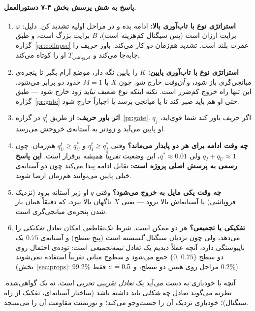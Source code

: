 \documentclass[12pt,a4paper]{article}
\begin{document}
\paragraph{پاسخ به شش پرسش بخش ۴-۷ دستورالعمل.}
\begin{enumerate}[leftmargin=1.7em,itemsep=3pt]
  \item \textbf{استراتژی نوع با تاب‌آوری بالا:} ادامه بده و در مراحل اولیه
        تشدید کن. دلیل: $\varphi$ برایت ارزان است (پس سیگنال کم‌هزینه است)،
        $B$ برایت بزرگ است، و طبق گزاره~\ref{pr:collapse} عمرت بلند است.
        تشدید هم‌زمان دو کار می‌کند: باور حریف را جابه‌جا می‌کند و
        $T_{\text{فروپاشی}}$ او را کوتاه می‌کند.
  \item \textbf{استراتژی نوع با تاب‌آوری پایین:} $K$ را پایین نگه دار، موضع
        آرام بگیر تا پنجره‌ی میانجی‌گری باز شود، و \emph{آن‌وقت} خارج شو.
        چون $X$ با $M=1$ حدود دو برابر می‌شود، این تنها راه خروج کم‌ضرر است.
        نکته اینکه نوع ضعیف \emph{نباید} زود خارج شود — طبق
        گزاره~\ref{pr:gate} حتی او هم باید صبر کند تا یا میانجی برسد یا
        اجباراً خارج شود.
  \item \textbf{اثر باور حریف:} از طریق $q_i^t$ در گزاره~\ref{pr:gate}. اگر
        حریف باور کند شما قوی‌اید، $q_j$ او پایین می‌آید و زودتر به آستانه‌ی
        خروجش می‌رسد.
  \item \textbf{چه وقت ادامه برای هر دو پایدار می‌ماند؟} وقتی
        $q_I^t\ge q_I^\ast$ و $q_U^t\ge q_U^\ast$ هم‌زمان. چون
        $q_I+q_U\approx1$ ولی $q^\ast\approx0.01$، این وضعیت \emph{تقریباً
        همیشه} برقرار است. \textbf{این پاسخ رسمی به پرسش اصلی پروژه است:}
        تقابل ادامه پیدا می‌کند چون دو آستانه‌ی خیلی پایین می‌توانند
        هم‌زمان ارضا شوند.
  \item \textbf{چه وقت یکی مایل به خروج می‌شود؟} وقتی $q$ او زیر آستانه
        برود (نزدیک فروپاشی) یا آستانه‌اش بالا برود — یعنی $X$ ناگهان بالا
        بپرد، که دقیقاً همان باز شدن پنجره‌ی میانجی‌گری است.
  \item \textbf{تفکیکی یا تجمیعی؟} هر دو ممکن است. شرط تک‌تقاطعی امکان
        تعادل \emph{تفکیکی} را می‌دهد، ولی چون نردبان سیگنال \emph{گسسته}
        است (پنج سطح) و آستانه‌ی $0.75$ یک ناپیوستگی دارد، آنچه عملاً
        دیدیم یک تعادل \emph{نیمه‌تجمیعی} است: توده‌ی احتمال روی دو سطح
        $\{0,\,0.75\}$ جمع می‌شود و سطوح میانی تقریباً استفاده نمی‌شوند
        (بخش~\ref{sec:props}: $99.2\%$ مراحل روی همین دو سطح، و
        $\sigma=0.5$ فقط $0.2\%$).
\end{enumerate}

\begin{remark}
آنچه با خودبازی به دست می‌آید یک \emph{تعادل تقریبی تجربی} است، نه یک
 گواهی‌شده. نظریه می‌گوید تعادل چه \emph{شکلی} باید داشته باشد
(ساختار آستانه‌ای، تفکیک از راه سیگنال)؛ خودبازی نزدیک آن را جست‌وجو می‌کند؛
و تورنمنت مقاومت آن را می‌سنجد.
\end{remark}
\end{document}

